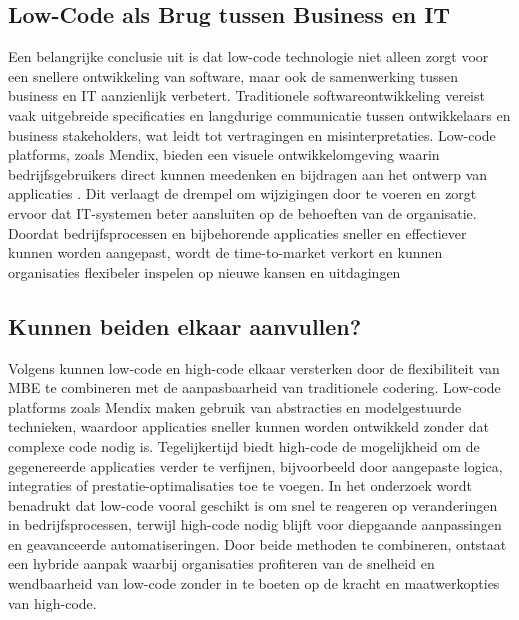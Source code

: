 \subsection{Low-Code als Brug tussen Business en IT}
Een belangrijke conclusie uit \textcite{Krouwel_2022} is dat low-code technologie niet alleen zorgt voor een snellere ontwikkeling van software, maar ook de samenwerking tussen business en IT aanzienlijk verbetert. Traditionele softwareontwikkeling vereist vaak uitgebreide specificaties en langdurige communicatie tussen ontwikkelaars en business stakeholders, wat leidt tot vertragingen en misinterpretaties. Low-code platforms, zoals Mendix, bieden een visuele ontwikkelomgeving waarin bedrijfsgebruikers direct kunnen meedenken en bijdragen aan het ontwerp van applicaties \autocite{Mendix}. Dit verlaagt de drempel om wijzigingen door te voeren en zorgt ervoor dat IT-systemen beter aansluiten op de behoeften van de organisatie. Doordat bedrijfsprocessen en bijbehorende applicaties sneller en effectiever kunnen worden aangepast, wordt de time-to-market verkort en kunnen organisaties flexibeler inspelen op nieuwe kansen en uitdagingen

\subsection{Kunnen beiden elkaar aanvullen?}
Volgens \textcite{Krouwel_2022} kunnen low-code en high-code elkaar versterken door de flexibiliteit van \gls{MBE} te combineren met de aanpasbaarheid van traditionele codering. Low-code platforms zoals Mendix maken gebruik van abstracties en modelgestuurde technieken, waardoor applicaties sneller kunnen worden ontwikkeld zonder dat complexe code nodig is. Tegelijkertijd biedt high-code de mogelijkheid om de gegenereerde applicaties verder te verfijnen, bijvoorbeeld door aangepaste logica, integraties of prestatie-optimalisaties toe te voegen. In het onderzoek wordt benadrukt dat low-code vooral geschikt is om snel te reageren op veranderingen in bedrijfsprocessen, terwijl high-code nodig blijft voor diepgaande aanpassingen en geavanceerde automatiseringen. Door beide methoden te combineren, ontstaat een hybride aanpak waarbij organisaties profiteren van de snelheid en wendbaarheid van low-code zonder in te boeten op de kracht en maatwerkopties van high-code.

